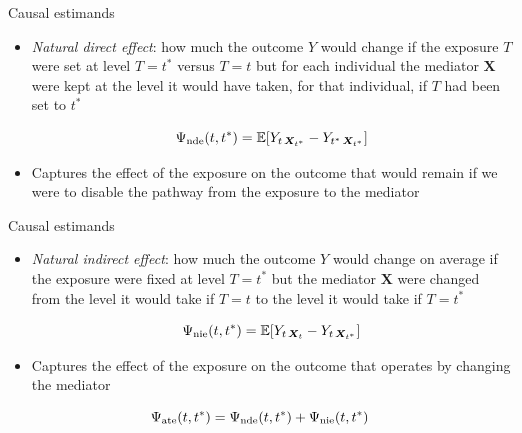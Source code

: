 \documentclass{beamer}
\theoremstyle{remark}
\newcommand{\X}{\bm X}
\newcommand{\ate}{\Psi_\text{ate} \paren*{t, t^*}}
\newcommand{\nde}{\Psi_\text{nde} \paren*{t, t^*}}
\newcommand{\nie}{\Psi_\text{nie} \paren*{t, t^*}}
\DeclarePairedDelimiter{\paren}{(}{)}
\DeclarePairedDelimiter{\brac}{[}{]}
\newcommand{\E}[2][]{%
   \ifthenelse{ \equal{#1}{} }
      {\ensuremath{\mathbb{E} \brac*{#2}}}
      {\ensuremath{\mathbb{E} \brac*{#2 \mid #1}}}
}
\begin{document}
\begin{frame}{Causal estimands}

    \begin{itemize}
        \item \emph{Natural direct effect}: how much the outcome $Y$ would change if the exposure $T$ were set at level $T = t^*$ versus $T = t$ but for each individual the mediator $\X$ were kept at the level it would have taken, for that individual, if $T$ had been set to $t^*$

              \begin{equation*}
                  \nde = \E{Y_{t \, \X_{t^*}} - Y_{t^* \, \X_{t^*}}}
              \end{equation*}

        \item Captures the effect of the exposure on the outcome that would remain if we were to disable the pathway from the exposure to the mediator

    \end{itemize}

\end{frame}

\begin{frame}{Causal estimands}

    \begin{itemize}
        \item \emph{Natural indirect effect}: how much the outcome $Y$ would change on average if the exposure were fixed at level $T = t^*$ but the mediator $\X$ were changed from the level it would take if $T=t$ to the level it would take if $T = t^*$

              \begin{equation*}
                  \nie = \E{Y_{t \, \X_{t}} - Y_{t \, \X_{t^*}}}
              \end{equation*}

        \item Captures the effect of the exposure on the outcome that operates by changing the mediator
    \end{itemize}

    \begin{equation*}
        \ate = \nde + \nie
    \end{equation*}

\end{frame}
\end{document}
